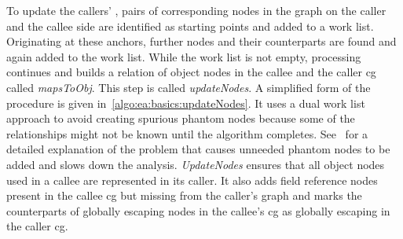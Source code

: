 			To update the callers' , pairs of corresponding nodes in the graph on the caller and the callee side
			are identified as starting points and added to a work list. Originating at these anchors, further nodes and their
			counterparts are found and again added to the work list. While the work list is not empty, processing continues
			and builds a relation of object nodes in the callee and the caller \gls{cg} called \emph{mapsToObj}. This step is
			called \emph{updateNodes}. A simplified form of the procedure is given in~\cref{algo:ea:basics:updateNodes}. It
			uses a dual work list approach to avoid creating spurious phantom nodes because some of the relationships might
			not be known until the algorithm completes. See~\cite[Sec.~3.2.1]{lang:12} for a detailed explanation of the
			problem that causes unneeded phantom nodes to be added and slows down the analysis. \emph{UpdateNodes} ensures
			that all object nodes used in a callee are represented in its caller. It also adds field reference nodes present
			in the callee \gls{cg} but missing from the caller's graph and marks the counterparts of globally escaping nodes
			in the callee's \gls{cg} as globally escaping in the caller \gls{cg}.


